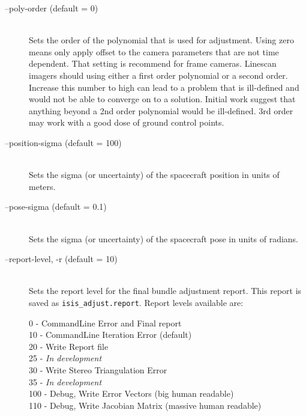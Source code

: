 \begin{description}
\item[--poly-order \textnormal{\small{(default = 0)}}] \hfill \\ 

  Sets the order of the polynomial that is used for adjustment. Using
  zero means only apply offset to the camera parameters that are not
  time dependent. That setting is recommend for frame
  cameras. Linescan imagers should using either a first order
  polynomial or a second order. Increase this number to high can lead
  to a problem that is ill-defined and would not be able to converge
  on to a solution. Initial work suggest that anything beyond a 2nd
  order polynomial would be ill-defined. 3rd order may work with a
  good dose of ground control points.

\item[--position-sigma \textnormal{\small{(default = 100)}}] \hfill \\
  Sets the sigma (or uncertainty) of the spacecraft position in
  units of meters.

\item[--pose-sigma \textnormal{\small{(default = 0.1)}}] \hfill \\
  Sets the sigma (or uncertainty) of the spacecraft pose in units
  of radians.

\item[--report-level, -r \textnormal{\small{(default = 10)}}] \hfill \\

  Sets the report level for the final bundle adjustment report.  This
  report is saved as \texttt{isis\_adjust.report}. Report levels
  available are:

  \begin{description}
    \item[0   - CommandLine Error and Final report]
    \item[10  - CommandLine Iteration Error (default)]
    \item[20  - Write Report file]
    \item[25  - \textnormal{\emph{In development}}]
    \item[30  - Write Stereo Triangulation Error]
    \item[35  - \textnormal{\emph{In development}}]
    \item[100 - Debug, Write Error Vectors (big human readable)]
    \item[110 - Debug, Write Jacobian Matrix (massive human readable)]
  \end{description}


\end{description}

